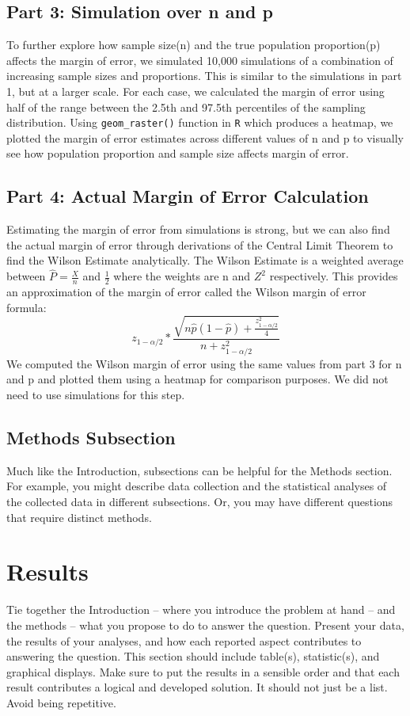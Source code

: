 \documentclass{article}\usepackage[]{graphicx}\usepackage[]{xcolor}
\begin{document}
\begin{multicols}{2}
\subsection{Part 3: Simulation over n and p}

To further explore how sample size(n) and the true population proportion(p) affects the margin of error, we simulated 10,000 simulations of a combination of increasing sample sizes and proportions. This is similar to the simulations in part 1, but at a larger scale. For each case, we calculated the margin of error using half of the range between the 2.5th and 97.5th percentiles of the sampling distribution. Using \texttt{geom\_raster()} function in \texttt{R} which produces a heatmap, we plotted the margin of error estimates across different values of n and p to visually see how population proportion and sample size affects margin of error.

\subsection{Part 4: Actual Margin of Error Calculation}

Estimating the margin of error from simulations is strong, but we can also find the actual margin of error through derivations of the Central Limit Theorem to find the Wilson Estimate analytically. The Wilson Estimate is a weighted average between \(\hat{P} = \frac{X}{n}\) and \(\frac{1}{2}\) where the weights are n and \(Z^2\) respectively. This provides an approximation of the margin of error called the Wilson margin of error formula:
$$
z_{1 - \alpha/2} * \frac{ \sqrt{n \hat{p} (1 - \hat{p}) + \frac{z_{1 - \alpha/2}^2}{4}} }{n + z_{1 - \alpha/2}^2}
$$
We computed the Wilson margin of error using the same values from part 3 for n and p and plotted them using a heatmap for comparison purposes. We did not need to use simulations for this step.

\subsection{Methods Subsection}
Much like the Introduction, subsections can be helpful for the Methods section. For example, you might describe data collection and the statistical analyses of the collected data in different subsections. Or, you may have different questions that require distinct methods. 

\section{Results}
Tie together the Introduction -- where you introduce the problem at hand -- and the methods --  what you propose to do to answer the question. Present your data, the results of your analyses, and how each reported aspect contributes to answering the question. This section should include table(s), statistic(s), and graphical displays. Make sure to put the results in a sensible order and that each result contributes a logical and developed solution. It should not just be a list. Avoid being repetitive. 


\end{multicols}
\end{document}

